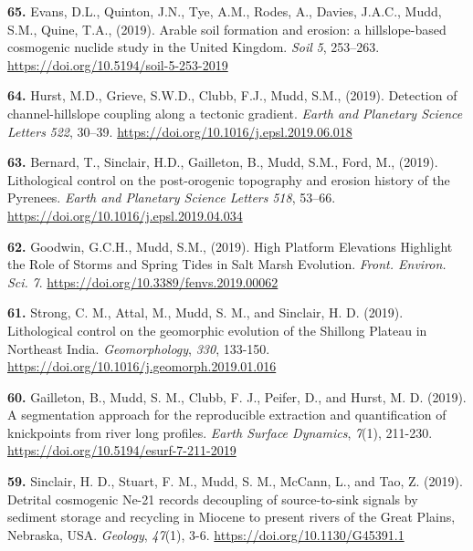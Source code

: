 \documentclass[10pt, a4paper]{article}
\newcommand{\years}[1]{\marginnote{\scriptsize #1}}
\begin{document}
\years{2019}\hangindent=0.7cm\textbf{65. }Evans, D.L., Quinton, J.N., Tye, A.M., Rodes, A., Davies, J.A.C., Mudd, S.M., Quine, T.A., (2019). Arable soil formation and erosion: a hillslope-based cosmogenic nuclide study in the United Kingdom. \textit{Soil} \textit{5}, 253–263. \href{https://doi.org/10.5194/soil-5-253-2019}{https://doi.org/10.5194/soil-5-253-2019}\par
\years{2019}\hangindent=0.7cm\textbf{64. }Hurst, M.D., Grieve, S.W.D., Clubb, F.J., Mudd, S.M., (2019). Detection of channel-hillslope coupling along a tectonic gradient. \textit{Earth and Planetary Science Letters} \textit{522}, 30–39. \href{https://doi.org/10.1016/j.epsl.2019.06.018}{https://doi.org/10.1016/j.epsl.2019.06.018}\par
\years{2019}\hangindent=0.7cm\textbf{63. }Bernard, T., Sinclair, H.D., Gailleton, B., Mudd, S.M., Ford, M., (2019). Lithological control on the post-orogenic topography and erosion history of the Pyrenees. \textit{Earth and Planetary Science Letters} \textit{518}, 53–66. \href{https://doi.org/10.1016/j.epsl.2019.04.034}{https://doi.org/10.1016/j.epsl.2019.04.034}\par
\years{2019}\hangindent=0.7cm\textbf{62. }Goodwin, G.C.H., Mudd, S.M., (2019). High Platform Elevations Highlight the Role of Storms and Spring Tides in Salt Marsh Evolution. \textit{Front. Environ. Sci.} \textit{7}. \href{https://doi.org/10.3389/fenvs.2019.00062}{https://doi.org/10.3389/fenvs.2019.00062}\par
\years{2019}\hangindent=0.7cm\textbf{61. }Strong, C. M., Attal, M., Mudd, S. M., and Sinclair, H. D. (2019). Lithological control on the geomorphic evolution of the Shillong Plateau in Northeast India. \textit{Geomorphology}, \textit{330}, 133-150. \href{https://doi.org/10.1016/j.geomorph.2019.01.016}{https://doi.org/10.1016/j.geomorph.2019.01.016}\par
\years{2019}\hangindent=0.7cm\textbf{60. }Gailleton, B., Mudd, S. M., Clubb, F. J., Peifer, D., and Hurst, M. D. (2019). A segmentation approach for the reproducible extraction and quantification of knickpoints from river long profiles. \textit{Earth Surface Dynamics}, \textit{7}(1), 211-230. \href{https://doi.org/10.5194/esurf-7-211-2019}{https://doi.org/10.5194/esurf-7-211-2019}\par
\years{2019}\hangindent=0.7cm\textbf{59. }Sinclair, H. D., Stuart, F. M., Mudd, S. M., McCann, L., and Tao, Z. (2019). Detrital cosmogenic Ne-21 records decoupling of source-to-sink signals by sediment storage and recycling in Miocene to present rivers of the Great Plains, Nebraska, USA. \textit{Geology}, \textit{47}(1), 3-6. \href{https://doi.org/10.1130/G45391.1}{https://doi.org/10.1130/G45391.1}\par
\end{document}
